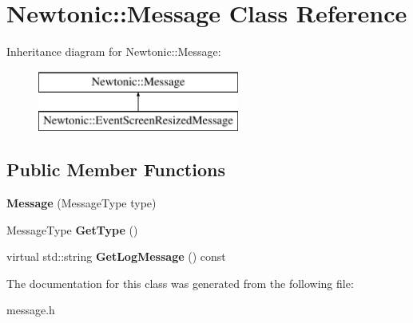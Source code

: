 \hypertarget{classNewtonic_1_1Message}{}\section{Newtonic\+::Message Class Reference}
\label{classNewtonic_1_1Message}
Inheritance diagram for Newtonic\+::Message\+:\begin{figure}[H]
\begin{center}
\leavevmode
\includegraphics[height=2.000000cm]{classNewtonic_1_1Message}
\end{center}
\end{figure}
\subsection*{Public Member Functions}
\begin{DoxyCompactItemize}
\item 
\mbox{\label{classNewtonic_1_1Message_a0ad02a83f5081e40eb0dd1ce8afced25}} 
{\bfseries Message} (Message\+Type type)
\item 
\mbox{\label{classNewtonic_1_1Message_a30bfb0706aa96850ea446658d600d370}} 
Message\+Type {\bfseries Get\+Type} ()
\item 
\mbox{\label{classNewtonic_1_1Message_a22232db4412b60b328192e9aa6f9b466}} 
virtual std\+::string {\bfseries Get\+Log\+Message} () const
\end{DoxyCompactItemize}


The documentation for this class was generated from the following file\+:\begin{DoxyCompactItemize}
\item 
message.\+h\end{DoxyCompactItemize}

